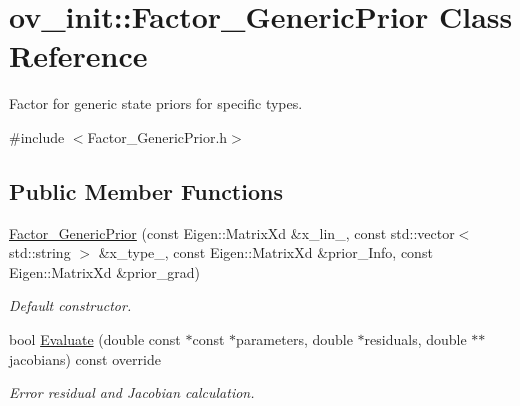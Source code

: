 \hypertarget{classov__init_1_1Factor__GenericPrior}{}\section{ov\+\_\+init\+:\+:Factor\+\_\+\+Generic\+Prior Class Reference}
\label{classov__init_1_1Factor__GenericPrior}


Factor for generic state priors for specific types.  




{\ttfamily \#include $<$Factor\+\_\+\+Generic\+Prior.\+h$>$}

\subsection*{Public Member Functions}
\begin{DoxyCompactItemize}
\item 
\mbox{\label{classov__init_1_1Factor__GenericPrior_a9f3839a153e85d5836b12eaa68f3d565}} 
\hyperlink{classov__init_1_1Factor__GenericPrior_a9f3839a153e85d5836b12eaa68f3d565}{Factor\+\_\+\+Generic\+Prior} (const Eigen\+::\+Matrix\+Xd \&x\+\_\+lin\+\_\+, const std\+::vector$<$ std\+::string $>$ \&x\+\_\+type\+\_\+, const Eigen\+::\+Matrix\+Xd \&prior\+\_\+\+Info, const Eigen\+::\+Matrix\+Xd \&prior\+\_\+grad)
\begin{DoxyCompactList}\small\item\em Default constructor. \end{DoxyCompactList}\item 
\mbox{\label{classov__init_1_1Factor__GenericPrior_aba62008b7e579108e0cc05ef182f033c}} 
bool \hyperlink{classov__init_1_1Factor__GenericPrior_aba62008b7e579108e0cc05ef182f033c}{Evaluate} (double const $\ast$const $\ast$parameters, double $\ast$residuals, double $\ast$$\ast$jacobians) const override
\begin{DoxyCompactList}\small\item\em Error residual and Jacobian calculation. \end{DoxyCompactList}\end{DoxyCompactItemize}

